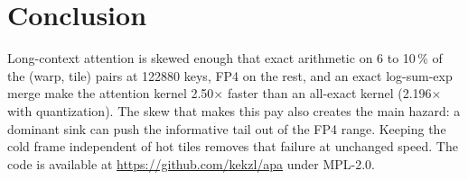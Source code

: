 \documentclass[10pt,twocolumn]{article}
\begin{document}
\section{Conclusion}

Long-context attention is skewed enough that exact arithmetic on 6 to 10\,\% of the (warp, tile) pairs at 122880
keys, FP4 on the rest, and an exact log-sum-exp merge make the attention kernel 2.50$\times$ faster than an
all-exact kernel (2.196$\times$ with quantization). The
skew that makes this pay also creates the main hazard: a dominant sink can push the informative tail out of
the FP4 range. Keeping the cold frame independent of hot tiles removes that failure at unchanged speed. The code is
available at \url{https://github.com/kekzl/apa} under MPL-2.0.



\end{document}
